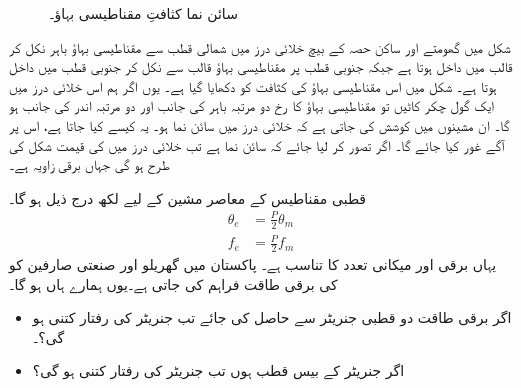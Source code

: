 \begin{figure}
\begin{minipage}{0.45\textwidth}
\caption{چار قطب، دو لچھے مشین میں مقناطیسی بہاؤ۔}
\label{شکل_گھومتے_مشین_چار_قطب_کا_بہاو}
\end{minipage}%
\begin{minipage}{0.45\textwidth}
\centering
\caption{سائن نما کثافتِ مقناطیسی بہاؤ۔}
\label{شکل_گھومتے_مشین_سائن_نما_بہاو}
\end{minipage}%
\end{figure}



شکل  میں گھومتے اور ساکن حصہ کے بیچ خلائی درز میں  شمالی قطب سے مقناطیسی بہاؤ باہر نکل کر  قالب میں داخل ہوتا ہے جبکہ جنوبی قطب پر مقناطیسی بہاؤ قالب سے نکل کر جنوبی قطب میں  داخل ہوتا ہے۔ شکل   میں اس مقناطیسی بہاؤ کی کثافت کو دکھایا گیا ہے۔ یوں اگر ہم اس خلائی درز میں ایک گول چکر کاٹیں تو مقناطیسی بہاؤ کا رخ  دو مرتبہ باہر کی جانب اور دو مرتبہ اندر کی جانب ہو گا۔ ان مشینوں  میں کوشش کی جاتی ہے کہ خلائی درز میں  سائن نما ہو۔ یہ کیسے کیا جاتا ہے، اس پر آگے غور کیا جائے گا۔ اگر تصور کر لیا جائے کہ  سائن نما ہے تب  خلائی درز میں  کی   قیمت شکل   کی طرح ہو گی جہاں  برقی زاویہ ہے۔ 

 قطبی مقناطیس کے معاصر مشین  کے لیے لکھ درج ذیل ہو گا۔
\begin{align}
\theta_e&=\frac{P}{2} \theta_m\label{مساوات_گھومتے_مشین_برقی_میکانی_زاویہ_تعلق}\\
f_e&=\frac{P}{2} f_m  \label{مساوات_گھومتے_مشین_برقی_میکانی_تعدد_تعلق}
\end{align}
یہاں برقی اور میکانی  تعدد کا تناسب  ہے۔ 
%
پاکستان میں گھریلو اور صنعتی صارفین کو  کی برقی طاقت فراہم کی جاتی ہے۔یوں ہمارے ہاں  ہو گا۔
\begin{itemize}
\item
اگر برقی طاقت دو قطبی جنریٹر سے حاصل کی جائے تب جنریٹر  کی رفتار کتنی ہو گی؟۔
\item
اگر جنریٹر کے بیس قطب ہوں تب  جنریٹر کی رفتار کتنی ہو گی؟
\end{itemize}

